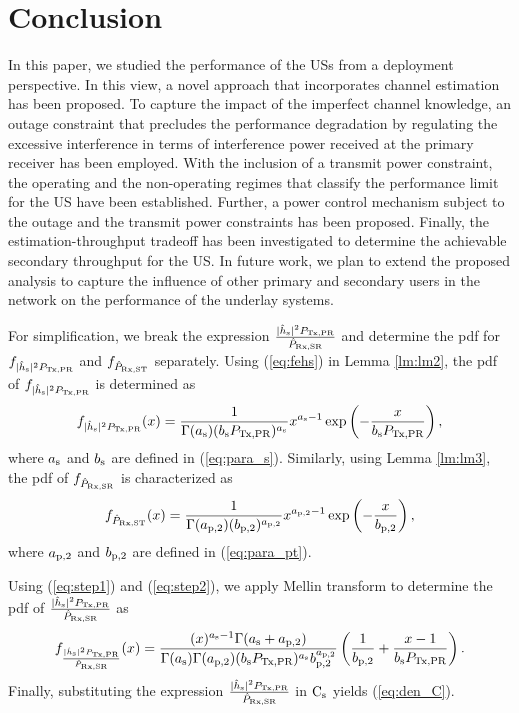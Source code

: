 \section{Conclusion} \label{sec:conc}
In this paper, we studied the performance of the USs from a deployment perspective. In this view, a novel approach that incorporates channel estimation has been proposed. To capture the impact of the imperfect channel knowledge, an outage constraint that precludes the performance degradation by regulating the excessive interference in terms of interference power received at the primary receiver has been employed. With the inclusion of a transmit power constraint, the operating and the non-operating regimes that classify the performance limit for the US have been established. Further, a power control mechanism subject to the outage and the transmit power constraints has been proposed. Finally, the estimation-throughput tradeoff has been investigated to determine the achievable secondary throughput for the US. %
In future work, we plan to extend the proposed analysis to capture the influence of other primary and secondary users in the network on the performance of the underlay systems. 
\begin{IEEEproof}
For simplification, we break the expression $\frac{|\hat{h}_{\text{s}}|^2 P_{\text{Tx,PR}}}{\hat{P}_{\text{Rx,SR}}}$ and determine the pdf for $f_{|\hat{h}_{\text{s}}|^2 P_{\text{Tx,PR}}}$ and $f_{\hat{P}_{\text{Rx,ST}}}$ separately.
Using (\ref{eq:fehs}) in Lemma \ref{lm:lm2}, the pdf of $f_{|\hat{h}_{\text{s}}|^2 P_{\text{Tx,PR}}}$ is determined as
\begin{align}
f_{|\hat{h}_{\text{s}}|^2 P_{\text{Tx,PR}}}(x) = \frac{1}{\Gamma(a_{\text{s}}) (b_{\text{s}} P_{\text{Tx,PR}})^{a_{\text{s}}}} x^{a_{\text{s}} - 1} \exp\left( - \frac{x}{ b_{\text{s}} P_{\text{Tx,PR}}} \right), \label{eq:step1} 
\end{align}
where $a_{\text{s}}$ and $b_{\text{s}}$ are defined in (\ref{eq:para_s}).
Similarly, using Lemma \ref{lm:lm3}, the pdf of $f_{\hat{P}_{\text{Rx,SR}}}$ is characterized as
\begin{align}
f_{\hat{P}_{\text{Rx,ST}}}(x) = \frac{1}{\Gamma(a_{\text{p,2}}) (b_{\text{p,2}})^{a_{\text{p,2}}}} x^{a_{\text{p,2}} - 1} \exp\left( - \frac{x}{ b_{\text{p,2}}} \right), \label{eq:step2} 
\end{align}
where $a_{\text{p,2}}$ and $b_{\text{p,2}}$ are defined in (\ref{eq:para_pt}).

Using (\ref{eq:step1}) and (\ref{eq:step2}), we apply Mellin transform \cite{NIST} to determine the pdf of $\frac{|\hat{h}_{\text{s}}|^2 P_{\text{Tx,PR}}}{\hat{P}_{\text{Rx,SR}}}$ as
\begin{align}
f_{\frac{|\hat{h}_{\text{s}}|^2 P_{\text{Tx,PR}}}{\hat{P}_{\text{Rx,SR}}}}(x) = \frac{(x)^{a_{\text{s}} - 1} \Gamma(a_{\text{s}} + a_{\text{p,2}})}{\Gamma(a_{\text{s}}) \Gamma(a_{\text{p,2}}) (b_{\text{s}} P_{\text{Tx,PR}}) ^{a_{\text{s}}} b_{\text{p,2}}^{a_{\text{p,2}}}} \left(\frac{1}{b_{\text{p,2}}} + \frac{x - 1}{b_{\text{s}} P_{\text{Tx,PR}}}\right).
\end{align}
Finally, substituting the expression $\frac{|\hat{h}_{\text{s}}|^2 P_{\text{Tx,PR}}}{\hat{P}_{\text{Rx,SR}}}$ in $\text{C}_{\text{s}}$ yields (\ref{eq:den_C}).
\end{IEEEproof}


